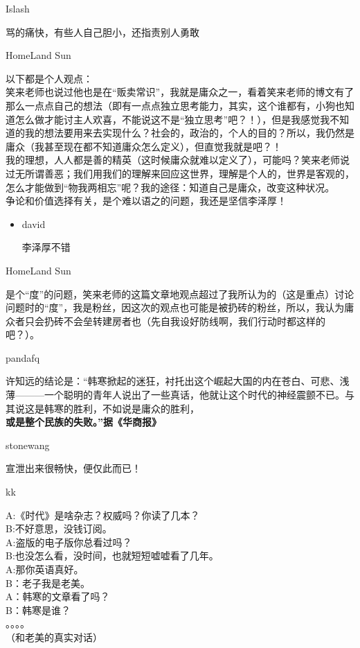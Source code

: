 Islash

骂的痛快，有些人自己胆小，还指责别人勇敢

HomeLand Sun

以下都是个人观点：\\
笑来老师也说过他也是在``贩卖常识''，我就是庸众之一，看着笑来老师的博文有了那么一点点自己的想法（即有一点点独立思考能力，其实，这个谁都有，小狗也知道怎么做才能讨主人欢喜，不能说这不是``独立思考''吧？！），但是我感觉我不知道的我的想法要用来去实现什么？社会的，政治的，个人的目的？所以，我仍然是庸众（我甚至现在都不知道庸众怎么定义），但直觉我就是吧？！\\
我的理想，人人都是善的精英（这时候庸众就难以定义了），可能吗？笑来老师说过无所谓善恶；我们用我们的理解来回应这世界，理解是个人的，世界是客观的，怎么才能做到``物我两相忘''呢？我的途径：知道自己是庸众，改变这种状况。\\
争论和价值选择有关，是个难以语之的问题，我还是坚信李泽厚！

\begin{itemize}[<+->]
\item
  david

  李泽厚不错
\end{itemize}

HomeLand Sun

是个``度''的问题，笑来老师的这篇文章地观点超过了我所认为的（这是重点）讨论问题时的``度''，我是粉丝，因这次的观点也可能是被扔砖的粉丝，所以，我认为庸众者只会扔砖不会垒转建房者也（先自我设好防线啊，我们行动时都这样的吧？）。

pandafq

许知远的结论是：``韩寒掀起的迷狂，衬托出这个崛起大国的内在苍白、可悲、浅薄---------一个聪明的青年人说出了一些真话，他就让这个时代的神经震颤不已。与其说这是韩寒的胜利，不如说是庸众的胜利，\textbf{或是整个民族的失败。}\textbf{''据《华商报》}

stonewang

宣泄出来很畅快，便仅此而已！

kk

A:《时代》是啥杂志？权威吗？你读了几本？\\ B:不好意思，没钱订阅。\\
A:盗版的电子版你总看过吗？\\ B:也没怎么看，没时间，也就短短嘘嘘看了几年。\\
A:那你英语真好。\\ B：老子我是老美。\\ A：韩寒的文章看了吗？\\
B：韩寒是谁？\\ 。。。。\\ （和老美的真实对话）

